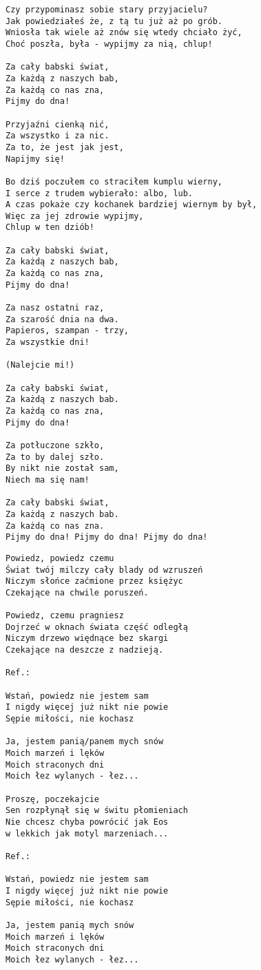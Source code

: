 \documentclass[12pt]{article}
\begin{document}
\begin{verbatim}
Czy przypominasz sobie stary przyjacielu?
Jak powiedziałeś że, z tą tu już aż po grób.
Wniosła tak wiele aż znów się wtedy chciało żyć,
Choć poszła, była - wypijmy za nią, chlup!

Za cały babski świat,
Za każdą z naszych bab,
Za każdą co nas zna,
Pijmy do dna!

Przyjaźni cienką nić,
Za wszystko i za nic.
Za to, że jest jak jest,
Napijmy się!

Bo dziś poczułem co straciłem kumplu wierny,
I serce z trudem wybierało: albo, lub.
A czas pokaże czy kochanek bardziej wiernym by był,
Więc za jej zdrowie wypijmy,
Chlup w ten dziób!

Za cały babski świat,
Za każdą z naszych bab,
Za każdą co nas zna,
Pijmy do dna!

Za nasz ostatni raz,
Za szarość dnia na dwa.
Papieros, szampan - trzy,
Za wszystkie dni!

(Nalejcie mi!)

Za cały babski świat,
Za każdą z naszych bab.
Za każdą co nas zna,
Pijmy do dna!

Za potłuczone szkło,
Za to by dalej szło.
By nikt nie został sam,
Niech ma się nam!

Za cały babski świat,
Za każdą z naszych bab.
Za każdą co nas zna.
Pijmy do dna! Pijmy do dna! Pijmy do dna! 
\end{verbatim}
\clearpage

\begin{verbatim}
Powiedz, powiedz czemu
Świat twój milczy cały blady od wzruszeń
Niczym słońce zaćmione przez księżyc
Czekające na chwile poruszeń.

Powiedz, czemu pragniesz
Dojrzeć w oknach świata część odległą
Niczym drzewo więdnące bez skargi
Czekające na deszcze z nadzieją.

Ref.:

Wstań, powiedz nie jestem sam
I nigdy więcej już nikt nie powie
Sępie miłości, nie kochasz

Ja, jestem panią/panem mych snów
Moich marzeń i lęków
Moich straconych dni
Moich łez wylanych - łez...

Proszę, poczekajcie
Sen rozpłynął się w świtu płomieniach
Nie chcesz chyba powrócić jak Eos
w lekkich jak motyl marzeniach...

Ref.:

Wstań, powiedz nie jestem sam
I nigdy więcej już nikt nie powie
Sępie miłości, nie kochasz

Ja, jestem panią mych snów
Moich marzeń i lęków
Moich straconych dni
Moich łez wylanych - łez...
\end{verbatim}
\clearpage
\end{document}
